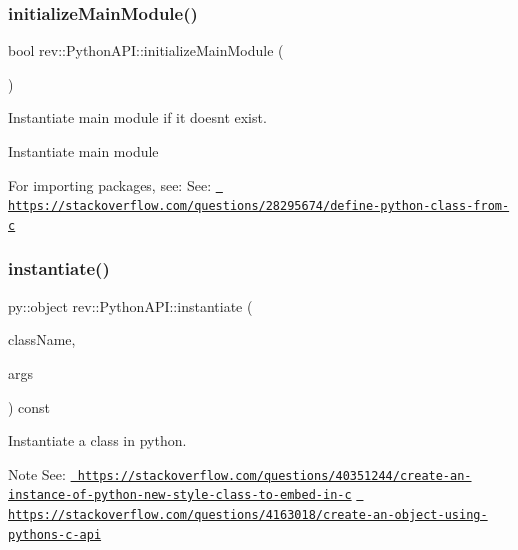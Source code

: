 \subsubsection{\texorpdfstring{initializeMainModule()}{initializeMainModule()}}
{\footnotesize\ttfamily bool rev\+::\+Python\+A\+P\+I\+::initialize\+Main\+Module (\begin{DoxyParamCaption}{ }\end{DoxyParamCaption})}



Instantiate main module if it doesn\textquotesingle{}t exist. 

Instantiate main module

For importing packages, see\+: See\+: \href{https://stackoverflow.com/questions/28295674/define-python-class-from-c}{\texttt{ https\+://stackoverflow.\+com/questions/28295674/define-\/python-\/class-\/from-\/c}} \mbox{\label{classrev_1_1_python_a_p_i_a35a8574cc24babeadf94a62e720c0866}} 
\subsubsection{\texorpdfstring{instantiate()}{instantiate()}}
{\footnotesize\ttfamily py\+::object rev\+::\+Python\+A\+P\+I\+::instantiate (\begin{DoxyParamCaption}\item[{const \mbox{\hyperlink{classrev_1_1_g_string}{G\+String}} \&}]{class\+Name,  }\item[{const py\+::object \&}]{args }\end{DoxyParamCaption}) const}



Instantiate a class in python. 

\begin{DoxyNote}{Note}
See\+: \href{https://stackoverflow.com/questions/40351244/create-an-instance-of-python-new-style-class-to-embed-in-c}{\texttt{ https\+://stackoverflow.\+com/questions/40351244/create-\/an-\/instance-\/of-\/python-\/new-\/style-\/class-\/to-\/embed-\/in-\/c}} \href{https://stackoverflow.com/questions/4163018/create-an-object-using-pythons-c-api}{\texttt{ https\+://stackoverflow.\+com/questions/4163018/create-\/an-\/object-\/using-\/pythons-\/c-\/api}} 
\end{DoxyNote}
\mbox{\label{classrev_1_1_python_a_p_i_abf0f6260ad9e5676cbae1cee40f33430}} 
